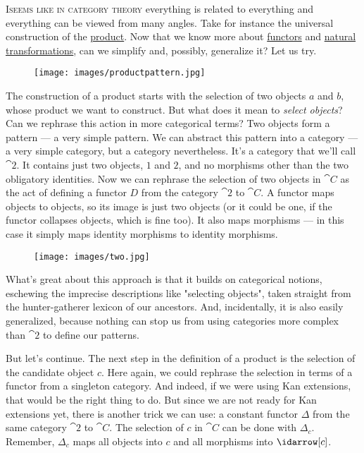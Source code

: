 \lettrine[lhang=0.17]{I}{seems like in category theory} everything is related to everything and
everything can be viewed from many angles. Take for instance the
universal construction of the \hyperref[products-and-coproducts]{product}.
Now that we know more about \hyperref[chap-functors]{functors} and
\hyperref[chap-natural-transformations]{natural transformations}, can we simplify and, possibly, generalize it? Let us
try.

\begin{figure}[H]
\centering
\texttt{[image: images/productpattern.jpg]}
\end{figure}

\noindent
The construction of a product starts with the selection of two objects
$a$ and $b$, whose product we want to construct. But what
does it mean to \emph{select objects}? Can we rephrase this action in
more categorical terms? Two objects form a pattern --- a very simple
pattern. We can abstract this pattern into a category --- a very simple
category, but a category nevertheless. It's a category that we'll call
$\cat{2}$. It contains just two objects, $1$ and $2$, and no morphisms
other than the two obligatory identities. Now we can rephrase the
selection of two objects in $\cat{C}$ as the act of defining a functor $D$
from the category $\cat{2}$ to $\cat{C}$. A functor maps objects to
objects, so its image is just two objects (or it could be one, if the
functor collapses objects, which is fine too). It also maps morphisms
--- in this case it simply maps identity morphisms to identity
morphisms.

\begin{figure}[H]
\centering
\texttt{[image: images/two.jpg]}
\end{figure}

\noindent
What's great about this approach is that it builds on categorical
notions, eschewing the imprecise descriptions like "selecting
objects", taken straight from the hunter-gatherer lexicon of our
ancestors. And, incidentally, it is also easily generalized, because
nothing can stop us from using categories more complex than $\cat{2}$
to define our patterns.

But let's continue. The next step in the definition of a product is the
selection of the candidate object $c$. Here again, we could
rephrase the selection in terms of a functor from a singleton category.
And indeed, if we were using Kan extensions, that would be the right
thing to do. But since we are not ready for Kan extensions yet, there is
another trick we can use: a constant functor $\Delta$ from the same category
$\cat{2}$ to $\cat{C}$. The selection of $c$ in $\cat{C}$ can be
done with $\Delta_c$. Remember, $\Delta_c$ maps all
objects into $c$ and all morphisms into $\idarrow[c]$.

